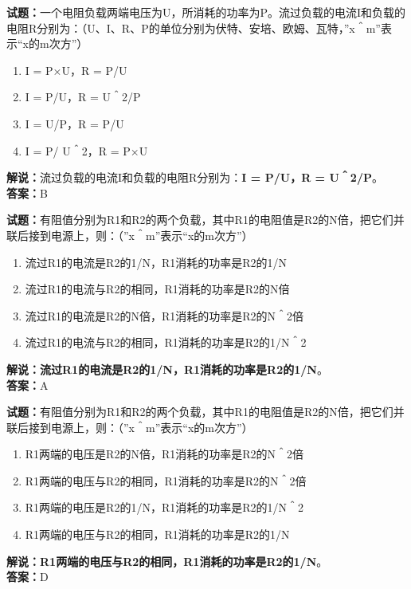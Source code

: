 \documentclass{ctexbook}
\begin{document}
\bigskip


\noindent\textbf{试题：}一个电阻负载两端电压为U，所消耗的功率为P。流过负载的电流I和负载的电阻R分别为：（U、I、R、P的单位分别为伏特、安培、欧姆、瓦特，”x＾m”表示“x的m次方”）
\begin{enumerate}[leftmargin=3em]
\item I = P×U，R = P/U
\item I = P/U，R = U＾2/P
\item I = U/P，R = P/U
\item I = P/ U＾2，R = P×U
\end{enumerate}
\noindent\textbf{解说：}流过负载的电流I和负载的电阻R分别为：\textbf{I = P/U，R = U＾2/P}。\\\noindent\textbf{答案：}B




\bigskip


\noindent\textbf{试题：}有阻值分别为R1和R2的两个负载，其中R1的电阻值是R2的N倍，把它们并联后接到电源上，则：（”x＾m”表示“x的m次方”）
\begin{enumerate}[leftmargin=3em]
\item 流过R1的电流是R2的1/N，R1消耗的功率是R2的1/N
\item 流过R1的电流与R2的相同，R1消耗的功率是R2的N倍
\item 流过R1的电流是R2的N倍，R1消耗的功率是R2的N＾2倍
\item 流过R1的电流与R2的相同，R1消耗的功率是R2的1/N＾2
\end{enumerate}
\noindent\textbf{解说：}\textbf{流过R1的电流是R2的1/N，R1消耗的功率是R2的1/N}。\\\noindent\textbf{答案：}A




\bigskip


\noindent\textbf{试题：}有阻值分别为R1和R2的两个负载，其中R1的电阻值是R2的N倍，把它们并联后接到电源上，则：（”x＾m”表示“x的m次方”）
\begin{enumerate}[leftmargin=3em]
\item R1两端的电压是R2的N倍，R1消耗的功率是R2的N＾2倍
\item R1两端的电压与R2的相同，R1消耗的功率是R2的N＾2倍
\item R1两端的电压是R2的1/N，R1消耗的功率是R2的1/N＾2
\item R1两端的电压与R2的相同，R1消耗的功率是R2的1/N
\end{enumerate}
\noindent\textbf{解说：}\textbf{R1两端的电压与R2的相同，R1消耗的功率是R2的1/N}。\\\noindent\textbf{答案：}D
\end{document}
